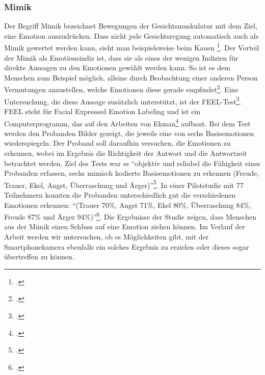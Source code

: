 \subsubsection{Mimik}
Der Begriff Mimik bezeichnet Bewegungen der Gesichtsmuskulatur mit dem Ziel, eine Emotion auszudrücken. Dass nicht jede Gesichtsregung automatisch auch als Mimik gewertet werden kann, sieht man beispielsweise beim Kauen \footcite[Vgl. ][Mimik: Eine kurze Definition]{Kar18}.\newline
Der Vorteil der Mimik als Emotionsindiz ist, dass sie als eines der wenigen Indizien für direkte Aussagen zu den Emotionen gewählt werden kann. So ist es dem Menschen zum Beispiel möglich, alleine durch Beobachtung einer anderen Person Vermutungen anzustellen, welche Emotionen diese gerade empfindet\footcite[Vgl. ][Die sieben Grundemotionen, Absatz 1]{Kar18}. Eine Untersuchung, die diese Aussage zusätzlich unterstützt, ist der FEEL-Test\footcite[][]{Kes02}. FEEL steht für Facial Expressed Emotion Labeling und ist ein Computerprogramm, das auf den Arbeiten von Ekman\footcite{Ekm92} aufbaut. Bei dem Test werden den Probanden Bilder gezeigt, die jeweils eine von sechs Basisemotionen wiederspiegeln. Der Proband soll daraufhin versuchen, die Emotionen zu erkennen, wobei im Ergebnis die Richtigkeit der Antwort und die Antwortzeit betrachtet werden. Ziel des Tests war es ``objektiv
und reliabel die Fähigkeit eines Probanden erfassen, sechs mimisch kodierte Basisemotionen zu erkennen (Freude, Trauer, Ekel, Angst, Überraschung und Ärger)''\footcite[siehe. ][S.5 Z.11ff]{Kes02}. In einer Pilotstudie mit 77 Teilnehmern konnten die Probanden unterschiedlich gut die verschiedenen Emotionen erkennen: ``(Trauer 
70\%, Angst 71\%, Ekel 80\%, Überraschung 84\%, Freude 87\% und Ärger 94\%)''\footcite[siehe. ][S.9 Z.9f]{Kes02}.\newline
Die Ergebnisse der Studie zeigen, dass Menschen aus der Mimik einen Schluss auf eine Emotion ziehen können. Im Verlauf der Arbeit werden wir untersuchen, ob es Möglichkeiten gibt, mit der Smartphonekamera ebenfalls ein solches Ergebnis zu erzielen oder dieses sogar übertreffen zu können. 
